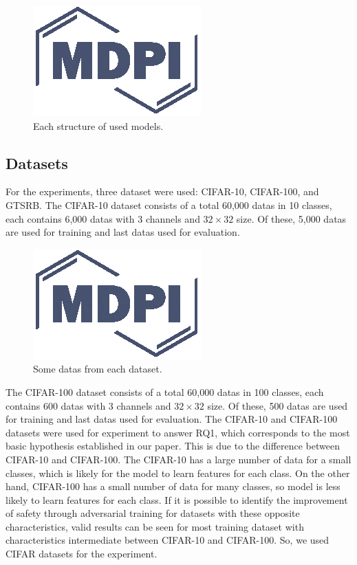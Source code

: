 \documentclass[journal,article,submit,moreauthors,pdftex]{Definitions/mdpi}
\begin{document}
\begin{figure}[H]
\includegraphics[width=5 cm]{Definitions/logo-mdpi}
\caption{Each structure of used models.\label{fig2}}
\end{figure}   

\subsection{Datasets}

For the experiments, three dataset were used: CIFAR-10, CIFAR-100, and GTSRB. The CIFAR-10 dataset consists of a total 60,000 datas in 10 classes, each contains 6,000 datas with 3 channels and \begin{math}{32\times 32}\end{math} size.
Of these, 5,000 datas are used for training and last datas used for evaluation.

\begin{figure}[H] 
\includegraphics[width=5 cm]{Definitions/logo-mdpi}
\caption{Some datas from each dataset.\label{fig3}}
\end{figure} 

The CIFAR-100 dataset consists of a total 60,000 datas in 100 classes, each contains 600 datas with 3 channels and \begin{math}{32\times 32}\end{math} size. Of these, 500 datas are used for training and last datas used for evaluation.
The CIFAR-10 and CIFAR-100 datasets were used for experiment to answer RQ1, which corresponds to the most basic hypothesis established in our paper.
This is due to the difference between CIFAR-10 and CIFAR-100. The CIFAR-10 has a large number of data for a small classes, which is likely for the model to learn features for each class. On the other hand, CIFAR-100 has a small number of data for many classes, so model is less likely to learn features for each class.
If it is possible to identify the improvement of safety through adversarial training for datasets with these opposite characteristics, valid results can be seen for most training dataset with characteristics intermediate between CIFAR-10 and CIFAR-100. So, we used CIFAR datasets for the experiment. \\
\end{document}
